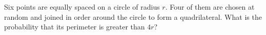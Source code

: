 Six points are equally spaced on a circle of radius $r$. Four of them are chosen at random and joined in order around the circle to form a quadrilateral. What is the probability that its perimeter is greater than $4r$?

